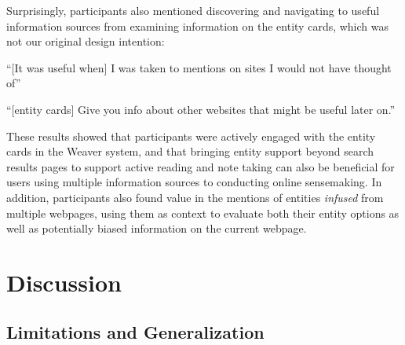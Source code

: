 
Surprisingly, participants also mentioned discovering and navigating to useful information sources from examining information on the entity cards, which was not our original design intention:

\begin{tightquote}
``[It was useful when] I was taken to mentions on sites I would not have thought of''

``[entity cards] Give you info about other websites that might be useful later on.''
\end{tightquote}



These results showed that participants were actively engaged with the entity cards in the Weaver system, and that bringing entity support beyond search results pages to support active reading and note taking can also be beneficial for users using multiple information sources to conducting online sensemaking. In addition, participants also found value in the mentions of entities \emph{infused} from multiple webpages, using them as context to evaluate both their entity options as well as potentially biased information on the current webpage.



\section{Discussion}

\subsection{Limitations and Generalization}


